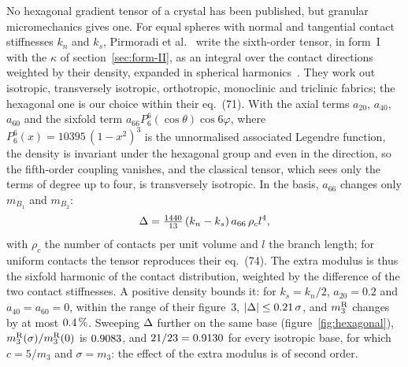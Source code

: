 No hexagonal gradient tensor of a crystal has been published, but granular
micromechanics gives one. For equal spheres with normal and tangential contact
stiffnesses $k_n$ and $k_s$, Pirmoradi et al.~\cite[eq.~(70)]{Pirmoradi2024} write the
sixth-order tensor, in form~I with the $\kappa$ of section~\ref{sec:form-II}, as an
integral over the contact directions weighted by their density, expanded in spherical
harmonics~\cite[eq.~(71)]{Pirmoradi2024}. They work out isotropic, transversely isotropic,
orthotropic, monoclinic and triclinic fabrics; the hexagonal one is our choice within their
eq.~(71). With the axial terms $a_{20}$, $a_{40}$, $a_{60}$ and the sixfold term
$a_{66}P_6^6(\cos\theta)\cos6\varphi$, where $P_6^6(x)=10395\,(1-x^2)^3$ is the
unnormalised associated Legendre function, the density is invariant under
the hexagonal group and even in the direction, so the fifth-order coupling vanishes, and
the classical tensor, which sees only the terms of degree up to four, is transversely
isotropic. In the basis, $a_{66}$ changes only $m_{B_1}$ and $m_{B_2}$:
\begin{equation}
\Delta=\tfrac{1440}{13}\,(k_n-k_s)\,a_{66}\,\rho_cl^4,\label{eq:hex-granular}
\end{equation}
with $\rho_c$ the number of contacts per unit volume and $l$ the branch length; for
uniform contacts the tensor reproduces their eq.~(74). The extra modulus is thus the
sixfold harmonic of the contact distribution, weighted by the difference of the two
contact stiffnesses. A positive density bounds it: for $k_s=k_n/2$, $a_{20}=0.2$ and $a_{40}=a_{60}=0$, within
the range of their figure~3, $|\Delta|\le0.21\,\sigma$, and $m_3^{\mathrm{R}}$ changes
by at most $0.4\,\%$. Sweeping $\Delta$ further on the same base
(figure~\ref{fig:hexagonal}), $m_3^{\mathrm{R}}(\sigma)/m_3^{\mathrm{R}}(0)$ is $0.9083$, and
$21/23=0.9130$ for every isotropic base, for which $c=5/m_3$ and
$\sigma=m_3$: the effect of the extra modulus is of second order.

\begin{table}[pos=tbp]
\caption{Voigt, Reuss and Hill estimates~\eqref{eq:cub-voigt}--\eqref{eq:cub-reuss} of the
cubic data sets of table~\ref{tab:block-moduli}: isotropic block moduli~\eqref{eq:iso-tensor}
(eV/\AA). Fe and W, which are not positive definite, have only the Voigt estimate. The last
digit shown is uncertain by at most five units; $\dagger$ marks a relative uncertainty
above 1\,\%, from the $m_E$ of Cu MEAM.}\label{tab:averages}
\centering\small

\end{table}

